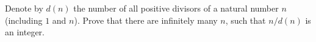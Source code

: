 Denote by $ d(n)$ the number of all positive divisors of a natural number $ n$ (including $ 1$ and $ n$). Prove that there are infinitely many $ n$,  such that $ n/d(n)$ is an integer.
